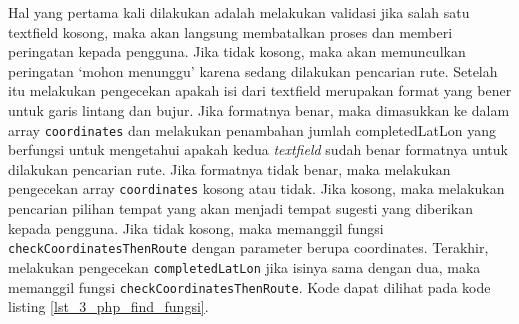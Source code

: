 Hal yang pertama kali dilakukan adalah melakukan validasi jika salah satu textfield kosong, maka akan langsung membatalkan proses dan memberi peringatan kepada pengguna. Jika tidak kosong, maka akan memunculkan peringatan `mohon menunggu' karena sedang dilakukan pencarian rute. Setelah itu melakukan pengecekan apakah isi dari textfield merupakan format yang bener untuk garis lintang dan bujur. Jika formatnya benar, maka dimasukkan ke dalam array \verb!coordinates! dan melakukan penambahan jumlah  completedLatLon yang berfungsi untuk mengetahui apakah kedua \textit{textfield} sudah benar formatnya untuk dilakukan pencarian rute. Jika formatnya tidak benar, maka melakukan pengecekan array \verb!coordinates! kosong atau tidak. 
Jika kosong, maka melakukan pencarian pilihan tempat yang akan menjadi tempat sugesti yang diberikan kepada pengguna. Jika tidak kosong, maka memanggil fungsi \verb!checkCoordinatesThenRoute! dengan parameter berupa coordinates. Terakhir, melakukan pengecekan \verb!completedLatLon! jika isinya sama dengan dua, maka memanggil fungsi \verb!checkCoordinatesThenRoute!. Kode dapat dilihat pada kode listing \ref{lst_3_php_find_fungsi}.

